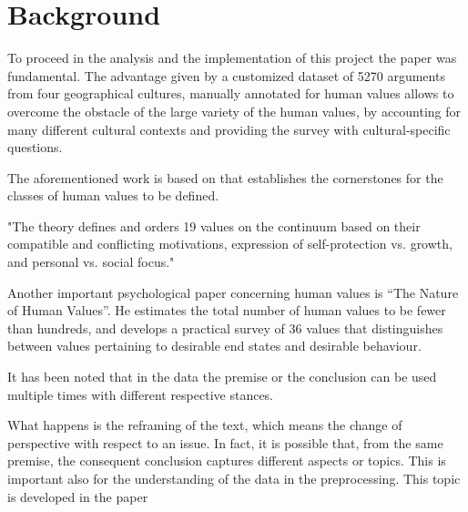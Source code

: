 \documentclass[11pt]{article}
\begin{document}


\section{Background}
\label{sec:background}

To proceed in the analysis and the implementation of this project the \cite{Kiesel2022} paper was fundamental.
The advantage given by a customized dataset of 5270 arguments from four geographical cultures, manually annotated for human values allows to overcome the obstacle of the large variety of the human values, by accounting for many different cultural contexts and providing the survey with cultural-specific questions.

The aforementioned work is based on \cite{Schwartz2012} that establishes the cornerstones for the classes of human values to be defined. 

"The theory defines and orders 19 values on the continuum based on their compatible and conflicting motivations, expression of self-protection vs. growth, and personal vs. social focus." \cite{Schwartz2012}

Another important psychological paper concerning human values is ``The Nature of Human Values''\cite{Rokeach1976}.
He estimates the total number of human values to be fewer than hundreds, and develops a practical survey of 36 values that distinguishes between values pertaining to desirable end states and desirable behaviour.

It has been noted that in the data the premise or the conclusion can be used multiple times with different respective stances.

What happens is the reframing of the text, which means the change of perspective with respect to an issue.
In fact, it is possible that, from the same premise, the consequent conclusion captures different aspects or topics.
This is important also for the understanding of the data in the preprocessing.
This topic is developed in the paper \cite{Chen2021}
\end{document}
